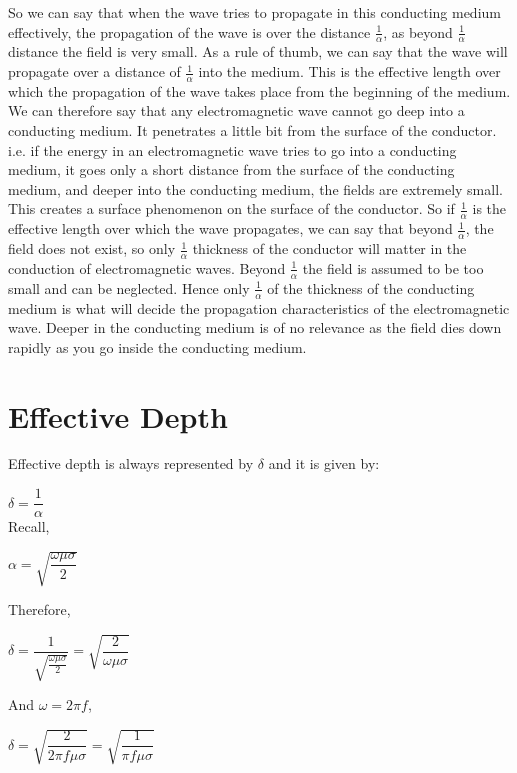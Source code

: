 So we can say that when the wave tries to propagate in this conducting medium effectively, the propagation of the wave is over the distance $\frac{1}{\alpha}$, as beyond $\frac{1}{\alpha}$ distance the field is very small. As a rule of thumb, we can say that the wave will propagate over a distance of $\frac{1}{\alpha}$ into the medium. This is the effective length over which the propagation of the wave takes place from the beginning of the medium. We can therefore say that any electromagnetic wave cannot go deep into a conducting medium. It penetrates a little bit from the surface of the conductor. i.e. if the energy in an electromagnetic wave tries to go into a conducting medium, it goes only a short distance from the surface of the conducting medium, and deeper into the conducting medium, the fields are extremely small. This creates a surface phenomenon on the surface of the conductor. So if $\frac{1}{\alpha}$  is the effective length over which the wave propagates, we can say that beyond $\frac{1}{\alpha}$, the field does not exist, so only $\frac{1}{\alpha}$ thickness of the conductor will matter in the conduction of electromagnetic waves. Beyond $\frac{1}{\alpha}$  the field is assumed to be too small and can be neglected. Hence only $\frac{1}{\alpha}$ of the thickness of the conducting medium is what will decide the propagation characteristics of the electromagnetic wave. Deeper in the conducting medium is of no relevance as the field dies down rapidly as you go inside the conducting medium.

\section{\textbf{Effective Depth}}

Effective depth is always represented by $\delta$ and it is given by:

$\delta=\dfrac{1}{\alpha}$
\\
Recall,
\begin{center}
$\alpha=\sqrt{\dfrac{\omega\mu\sigma}{2}}$
\end{center}

Therefore,
\begin{center}
$\delta=\dfrac{1}{\sqrt{\frac{\omega\mu\sigma}{2}}}=\sqrt{\dfrac{2}{\omega\mu\sigma}}$
\end{center}

And $\omega=2\pi f$,
\begin{center}
$\delta=\sqrt{\dfrac{2}{2\pi f\mu\sigma}}=\sqrt{\dfrac{1}{\pi f \mu\sigma}}$	
\end{center}

